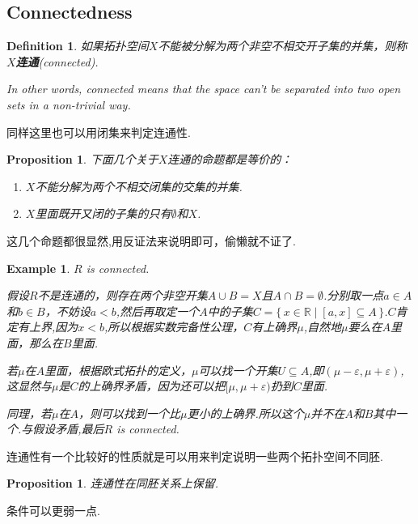 \documentclass{article}
\newtheorem{proposition}[theorem]{Proposition}
\newtheorem{example}[theorem]{Example}
\newtheorem{definition}[theorem]{Definition}
\newcommand\Set[2]{\{\,#1\mid#2\,\}} %
\begin{document}
\newpage
\subsection{Connectedness}

\begin{definition}
如果拓扑空间$X$不能被分解为两个非空不相交开子集的并集，则称$X$\textbf{连通}(connected).

\rm In other words, connected means that the space can’t be separated into two open sets in a non-trivial way.
\end{definition}

同样这里也可以用闭集来判定连通性.

\begin{proposition}
下面几个关于$X$连通的命题都是等价的：
\begin{enumerate}
	\item $X$不能分解为两个不相交闭集的交集的并集.
	\item $X$里面既开又闭的子集的只有$\emptyset$和$X$.
\end{enumerate}
\end{proposition}

这几个命题都很显然,用反证法来说明即可，偷懒就不证了.

\begin{example}
\rm $R$ is connected.

假设$R$不是连通的，则存在两个非空开集$A \cup B = X$且$A \cap B = \emptyset$.分别取一点$a \in A$和$b \in B$，不妨设$a < b$,然后再取定一个$A$中的子集$C=\Set{x \in \mathbb{R}}{[a,x] \subseteq A}$.$C$肯定有上界,因为$x < b$,所以根据实数完备性公理，$C$有上确界$\mu$,自然地$\mu$要么在$A$里面，那么在$B$里面.

若$\mu$在$A$里面，根据欧式拓扑的定义，$\mu$可以找一个开集$U \subseteq A$,即$(\mu-\varepsilon,\mu+\varepsilon)$,这显然与$\mu$是$C$的上确界矛盾，因为还可以把$[\mu,\mu+\varepsilon)$扔到$C$里面.

同理，若$\mu$在$A$，则可以找到一个比$\mu$更小的上确界.所以这个$\mu$并不在$A$和$B$其中一个.与假设矛盾,最后$R$ is connected.
\end{example}

连通性有一个比较好的性质就是可以用来判定说明一些两个拓扑空间不同胚.

\begin{proposition}
连通性在同胚关系上保留.
\end{proposition}

条件可以更弱一点.
\end{document}

